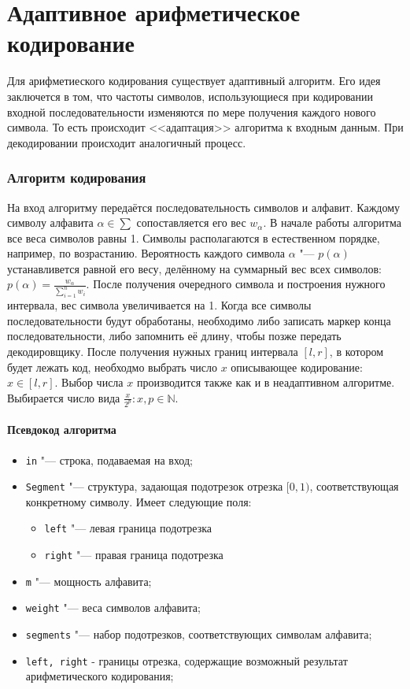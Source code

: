 \documentclass[12pt]{article}
\author{\copyright~~@mikhirurg}
\date{17 nov 2019}
\begin{document}
\pagestyle{fancy}
\part*{Адаптивное арифметическое кодирование}
Для арифметиеского кодирования существует адаптивный алгоритм. Его идея заключется в том, что частоты символов, использующиеся при кодировании входной последовательности изменяются по мере получения каждого нового символа. То есть происходит <<адаптация>> алгоритма к входным данным. При декодировании происходит аналогичный процесс.
\section*{Алгоритм кодирования}
На вход алгоритму передаётся последовательность символов и алфавит. Каждому символу алфавита $\alpha \in \sum $
сопоставляется его вес 
$ w_\alpha $. В начале работы алгоритма все веса символов равны 1.
Символы располагаются в естественном порядке, например, по возрастанию. Вероятность каждого символа $ \alpha $ "--- $ p(\alpha) $ устанавливется равной его весу, делённому на суммарный вес всех символов: $ p(\alpha) = \frac{w_\alpha}{\sum_{i=1}^n w_i} $. После получения очередного символа и построения нужного интервала, вес символа увеличивается на 1. Когда все символы последовательности будут обработаны, необходимо либо записать маркер конца последовательности, либо запомнить её длину, чтобы позже передать декодировщику. После получения нужных границ интервала $[l, r]$, в котором будет лежать код, необходмо выбрать число $ x $ описывающее кодирование:
$ x \in [l, r]$. Выбор числа $x$ производится также как и в неадаптивном алгоритме. Выбирается число вида $ \frac{x}{2^p}: x,p \in \mathbb N$.

\subsection*{Псевдокод алгоритма}

\begin{itemize}
	\item \verb'in' "--- строка, подаваемая на вход;
	\item \verb'Segment' "--- структура, задающая подотрезок отрезка $[0, 1)$, соответствующая конкретному символу.
   Имеет следующие поля:
   \begin{itemize}
		\item \verb'left' "--- левая граница подотрезка
		\item \verb'right' "--- правая граница подотрезка
	\end{itemize}
	\item \verb'm' "--- мощность алфавита;
   \item \verb'weight' "--- веса символов алфавита;
	\item \verb'segments' "--- набор подотрезков, соответствующих символам алфавита;
	\item \verb'left, right' - границы отрезка, содержащие возможный результат арифметического кодирования;
\end{itemize}
\end{document}
